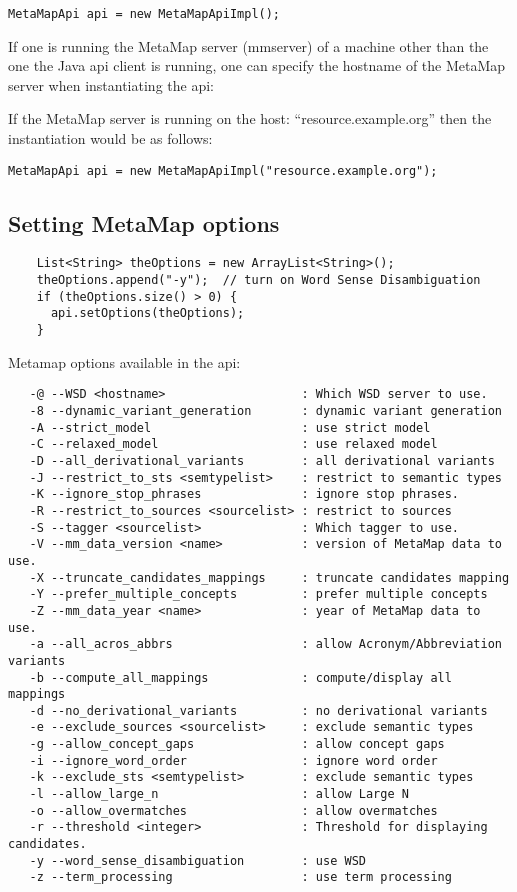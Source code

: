 \documentclass[11pt]{article}
\begin{document}
\begin{verbatim}
MetaMapApi api = new MetaMapApiImpl();
\end{verbatim}

If one is running the MetaMap server (mmserver) of a machine other
than the one the Java api client is running, one can specify the
hostname of the MetaMap server when instantiating the api:


If the MetaMap server is running on the host: ``resource.example.org''
then the instantiation would be as follows:

\begin{verbatim}
MetaMapApi api = new MetaMapApiImpl("resource.example.org");
\end{verbatim}

\subsection{Setting MetaMap options}
\label{Setting MetaMap options}
\begin{verbatim}
    List<String> theOptions = new ArrayList<String>();
    theOptions.append("-y");  // turn on Word Sense Disambiguation
    if (theOptions.size() > 0) {
      api.setOptions(theOptions);
    }
\end{verbatim}

Metamap options available in the api: 

\begin{verbatim}
   -@ --WSD <hostname>                   : Which WSD server to use.
   -8 --dynamic_variant_generation       : dynamic variant generation
   -A --strict_model                     : use strict model 
   -C --relaxed_model                    : use relaxed model 
   -D --all_derivational_variants        : all derivational variants
   -J --restrict_to_sts <semtypelist>    : restrict to semantic types
   -K --ignore_stop_phrases              : ignore stop phrases.
   -R --restrict_to_sources <sourcelist> : restrict to sources
   -S --tagger <sourcelist>              : Which tagger to use.
   -V --mm_data_version <name>           : version of MetaMap data to use.
   -X --truncate_candidates_mappings     : truncate candidates mapping
   -Y --prefer_multiple_concepts         : prefer multiple concepts
   -Z --mm_data_year <name>              : year of MetaMap data to use.
   -a --all_acros_abbrs                  : allow Acronym/Abbreviation variants
   -b --compute_all_mappings             : compute/display all mappings
   -d --no_derivational_variants         : no derivational variants
   -e --exclude_sources <sourcelist>     : exclude semantic types
   -g --allow_concept_gaps               : allow concept gaps
   -i --ignore_word_order                : ignore word order
   -k --exclude_sts <semtypelist>        : exclude semantic types
   -l --allow_large_n                    : allow Large N
   -o --allow_overmatches                : allow overmatches 
   -r --threshold <integer>              : Threshold for displaying candidates. 
   -y --word_sense_disambiguation        : use WSD 
   -z --term_processing                  : use term processing 
\end{verbatim}
\end{document}
